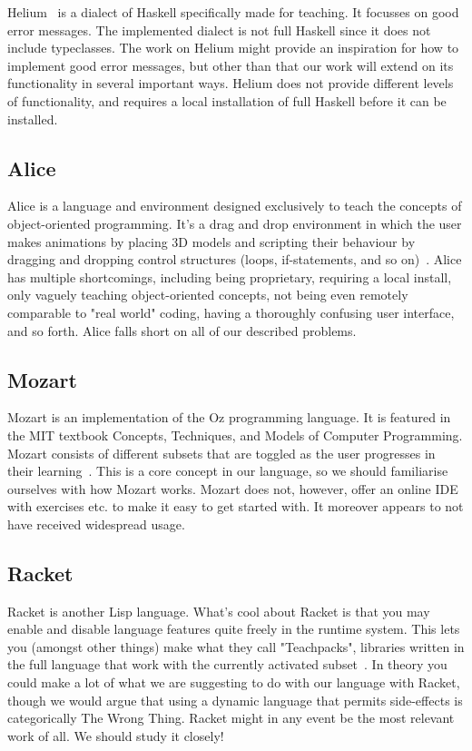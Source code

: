 Helium~\cite{DBLP:conf/haskell/HeerenLI03} is a dialect of Haskell specifically
made for teaching. It focusses on good error messages. The implemented dialect
is not full Haskell since it does not include typeclasses. The work on Helium
might provide an inspiration for how to implement good error messages, but other
than that our work will extend on its functionality in several important ways.
Helium does not provide different levels of functionality, and requires a local
installation of full Haskell before it can be installed.

\subsection{Alice}
Alice is a language and environment designed exclusively to teach the concepts 
of object-oriented programming. It's a drag and drop environment in which the 
user makes animations by placing 3D models and scripting their behaviour by 
dragging and dropping control structures (loops, if-statements, and so 
on)~\cite{alice2015whatisalice}. Alice has multiple shortcomings, including 
being proprietary, requiring a local install, only vaguely teaching 
object-oriented concepts, not being even remotely comparable to "real world" 
coding, having a thoroughly confusing user interface, and so forth. Alice 
falls short on all of our described problems.

\subsection{Mozart}
Mozart is an implementation of the Oz programming language. It is featured in 
the MIT textbook Concepts, Techniques, and Models of Computer Programming. 
Mozart consists of different subsets that are toggled as the user progresses 
in their learning~\cite{van2004concepts}. This is a core concept in our 
language, so we should familiarise ourselves with how Mozart works. Mozart 
does not, however, offer an online IDE with exercises etc. to make it easy to 
get started with. It moreover appears to not have received widespread usage.

\subsection{Racket}
Racket is another Lisp language. What's cool about Racket is that you may
enable and disable language features quite freely in the runtime system. This
lets you (amongst other things) make what they call "Teachpacks", libraries 
written in the full language that work with the currently activated 
subset~\cite{flatt2015racket}. In theory you could make a lot of what we are 
suggesting to do with our language with Racket, though we would argue that 
using a dynamic language that permits side-effects is categorically The Wrong 
Thing. Racket might in any event be the most relevant work of all. We should 
study it closely!

